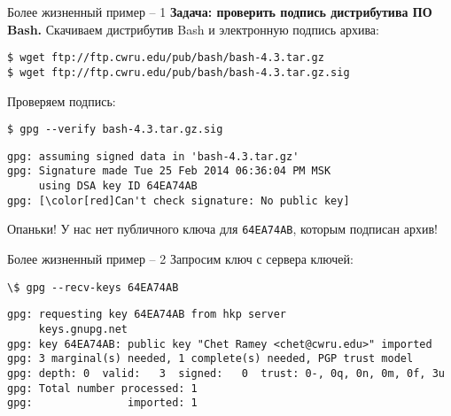 \documentclass[presentation]{beamer}
\begin{document}
\begin{frame}[fragile]{Более жизненный пример -- 1}
  \textbf{Задача: проверить подпись дистрибутива ПО Bash.}
  Скачиваем дистрибутив Bash и электронную подпись архива:
\begin{verbatim}
$ wget ftp://ftp.cwru.edu/pub/bash/bash-4.3.tar.gz
$ wget ftp://ftp.cwru.edu/pub/bash/bash-4.3.tar.gz.sig
\end{verbatim}
  Проверяем подпись:
\begin{verbatim}
$ gpg --verify bash-4.3.tar.gz.sig
\end{verbatim}
  \footnotesize
\begin{Verbatim}[commandchars=\\\[\]]
gpg: assuming signed data in 'bash-4.3.tar.gz'
gpg: Signature made Tue 25 Feb 2014 06:36:04 PM MSK
     using DSA key ID 64EA74AB
gpg: [\color[red]Can't check signature: No public key]
\end{Verbatim}
  \normalsize

  \vspace{5 mm}

  Опаньки!  У нас нет публичного ключа для \texttt{64EA74AB}, которым
  подписан архив!
\end{frame}


\begin{frame}[fragile]{Более жизненный пример -- 2}
  Запросим ключ с сервера ключей:
  \begin{Verbatim}[commandchars=\\\[\]]
\$ gpg --recv-keys 64EA74AB
  \end{Verbatim}
  \footnotesize
  \begin{Verbatim}[commandchars=\\\[\]]
gpg: requesting key 64EA74AB from hkp server
     keys.gnupg.net
gpg: key 64EA74AB: public key "Chet Ramey <chet@cwru.edu>" imported
gpg: 3 marginal(s) needed, 1 complete(s) needed, PGP trust model
gpg: depth: 0  valid:   3  signed:   0  trust: 0-, 0q, 0n, 0m, 0f, 3u
gpg: Total number processed: 1
gpg:               imported: 1
  \end{Verbatim}
  \normalsize
\end{frame}
\end{document}
